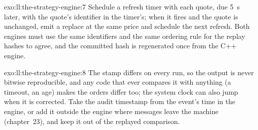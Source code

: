 \begin{solution}{exo:ll:the-strategy-engine:7}
Schedule a refresh timer with each quote, due \qty{5}{\second} later, with the quote's identifier in the timer's; when it fires and
the quote is unchanged, emit a replace at the same price and schedule the next refresh. Both engines must use the same
identifiers and the same ordering rule for the replay hashes to agree, and the committed hash is regenerated once from the
C++ engine.
\end{solution}

\begin{solution}{exo:ll:the-strategy-engine:8}
The stamp differs on every run, so the output is never bitwise reproducible, and any code that ever compares it with anything
(a timeout, an age) makes the orders differ too; the system clock can also jump when it is corrected. Take the audit timestamp
from the event's time in the engine, or add it outside the engine where messages leave the machine (chapter~23), and keep it
out of the replayed comparison.
\end{solution}

